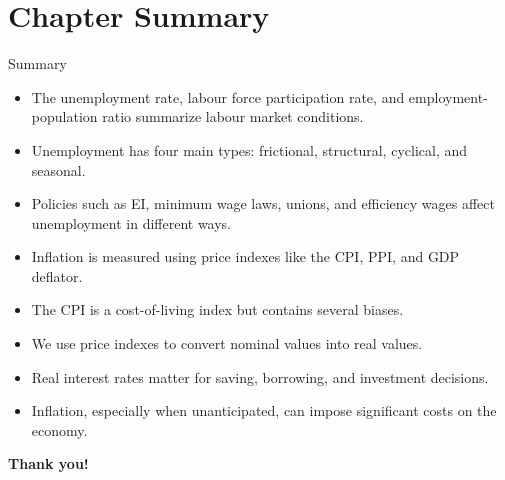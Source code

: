 \documentclass[aspectratio=169]{beamer}
\begin{document}
\section*{Chapter Summary}

\begin{frame}{Summary}
\transfade
\begin{itemize}
  \item The unemployment rate, labour force participation rate, and employment-population ratio summarize labour market conditions.
  \item Unemployment has four main types: frictional, structural, cyclical, and seasonal.
  \item Policies such as EI, minimum wage laws, unions, and efficiency wages affect unemployment in different ways.
  \item Inflation is measured using price indexes like the CPI, PPI, and GDP deflator.
  \item The CPI is a cost-of-living index but contains several biases.
  \item We use price indexes to convert nominal values into real values.
  \item Real interest rates matter for saving, borrowing, and investment decisions.
  \item Inflation, especially when unanticipated, can impose significant costs on the economy.
\end{itemize}
\end{frame}

\begin{frame}
\centering
\Huge \textbf{Thank you!}
\end{frame}
\end{document}
